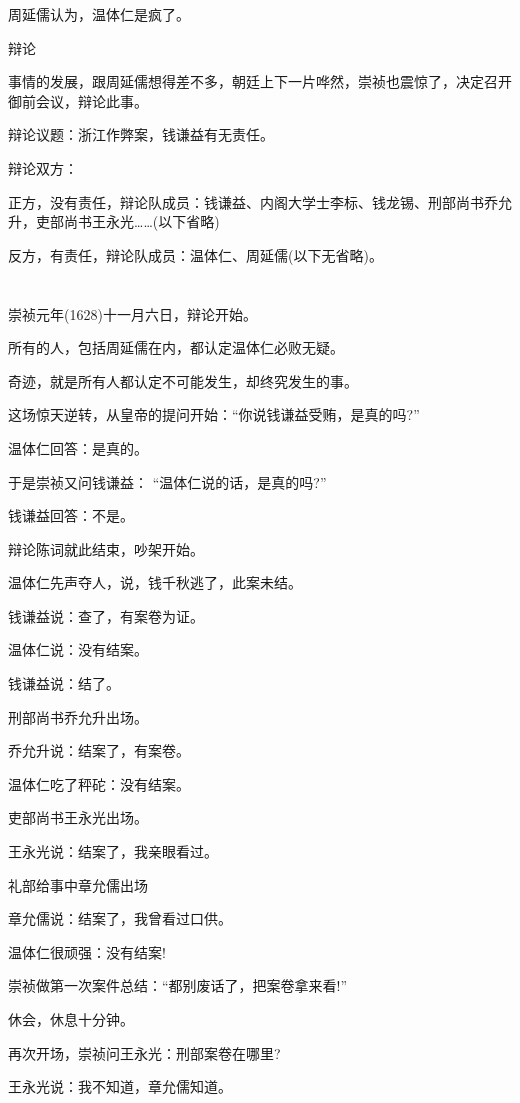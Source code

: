 \documentclass[11pt,a4paper,onecolumn]{article}
\begin{document}
周延儒认为，温体仁是疯了。

辩论

事情的发展，跟周延儒想得差不多，朝廷上下一片哗然，崇祯也震惊了，决定召开御前会议，辩论此事。

辩论议题：浙江作弊案，钱谦益有无责任。

辩论双方：

正方，没有责任，辩论队成员：钱谦益、内阁大学士李标、钱龙锡、刑部尚书乔允升，吏部尚书王永光……(以下省略)

反方，有责任，辩论队成员：温体仁、周延儒(以下无省略)。

\section[\thesection]{}

崇祯元年(1628)十一月六日，辩论开始。

所有的人，包括周延儒在内，都认定温体仁必败无疑。

奇迹，就是所有人都认定不可能发生，却终究发生的事。

这场惊天逆转，从皇帝的提问开始：``你说钱谦益受贿，是真的吗?''

温体仁回答：是真的。

于是崇祯又问钱谦益： ``温体仁说的话，是真的吗?''

钱谦益回答：不是。

辩论陈词就此结束，吵架开始。

温体仁先声夺人，说，钱千秋逃了，此案未结。

钱谦益说：查了，有案卷为证。

温体仁说：没有结案。

钱谦益说：结了。

刑部尚书乔允升出场。

乔允升说：结案了，有案卷。

温体仁吃了秤砣：没有结案。

吏部尚书王永光出场。

王永光说：结案了，我亲眼看过。

礼部给事中章允儒出场

章允儒说：结案了，我曾看过口供。

温体仁很顽强：没有结案!

崇祯做第一次案件总结：``都别废话了，把案卷拿来看!''

休会，休息十分钟。

再次开场，崇祯问王永光：刑部案卷在哪里?

王永光说：我不知道，章允儒知道。
\end{document}
